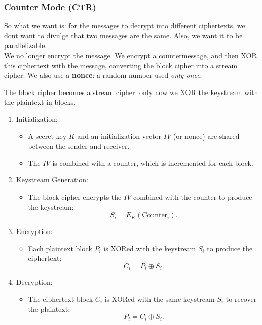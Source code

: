 \subsubsection{Counter Mode (CTR)}
So what we want is: for the messages to decrypt into different ciphertexts, we dont want to divulge that two messages are the same. Also, we want it to be parallelizable. \\ 

We no longer encrypt the message. We encrypt a countermessage, and then XOR this ciphertext with the message, converting the block cipher into a stream cipher. We also use a \textbf{nonce}: a random number used \emph{only once}.

The block cipher becomes a stream cipher: only now we XOR the keystream with the plaintext in blocks.

\begin{enumerate}
    \item Initialization:
    \begin{itemize}
        \item A secret key \( K \) and an initialization vector \( IV \) (or nonce) are shared between the sender and receiver.
        \item The \( IV \) is combined with a counter, which is incremented for each block.
    \end{itemize}

    \item Keystream Generation:
    \begin{itemize}
        \item The block cipher encrypts the \( IV \) combined with the counter to produce the keystream:
        \[
        S_i = E_K(\text{Counter}_i).
        \]
    \end{itemize}

    \item Encryption:
    \begin{itemize}
        \item Each plaintext block \( P_i \) is XORed with the keystream \( S_i \) to produce the ciphertext:
        \[
        C_i = P_i \oplus S_i.
        \]
    \end{itemize}

    \item Decryption:
    \begin{itemize}
        \item The ciphertext block \( C_i \) is XORed with the same keystream \( S_i \) to recover the plaintext:
        \[
        P_i = C_i \oplus S_i.
        \]
    \end{itemize}
\end{enumerate}

